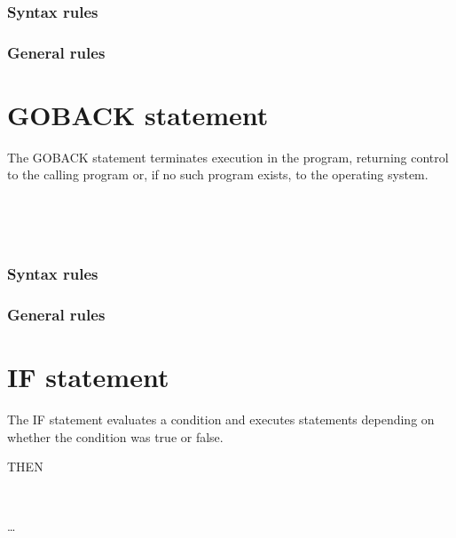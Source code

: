 \subsubsection{Syntax rules}

\subsubsection{General rules}

\section{GOBACK statement}

The GOBACK statement terminates execution in the program, returning control to the calling program or, if no such program exists, to the operating system.

\begin{syntax}
  \begin{0-1}
    \begin{1=}
       \\
    \end{1=}
    \begin{1=}
      \identifier \\
      \literal
    \end{1=}
  \end{0-1}
\end{syntax}

\subsubsection{Syntax rules}

\subsubsection{General rules}

\section{IF statement}

The IF statement evaluates a condition and executes statements depending on whether the condition was true or false.

\begin{syntax}
    THEN
  \begin{1=}
    \imperativestatement \\
     \imperativestatement
  \end{1=} \ldots

  \begin{0-1}
  \end{0-1}
\end{syntax}

